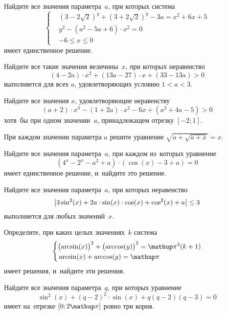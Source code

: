 \begin{problems}
\item
Найдите все значения параметра~$a$, при которых система
\[ \left\{ \begin{aligned} &
    (3 - 2 \sqrt{2})^{y} + (3 + 2 \sqrt{2})^{y} - 3 a
    =
    x^2 + 6 x + 5
\\ &
    y^2 - (a^2 - 5 a + 6) \cdot x^2 = 0
\\ &
    -6 \leq x \leq 0
\end{aligned} \right. \]
имеет единственное решение.


\item
Найдите все такие значения величины~$x$, при которых неравенство
\[
    (4 - 2 a) \cdot x^2 + (13 a - 27) \cdot x + (33 - 13 a) > 0
\]
выполняется для всех $a$, удовлетворяющих условию $1 < a < 3$.

\item
Найдите все значения $x$, удовлетворяющие неравенству
\[
    (a + 2) \cdot x^3 - (1 + 2 a) \cdot x^2 - 6 x + (a^2 + 4 a - 5) > 0
\]
хотя~бы при одном значении~$a$, принадлежащем отрезку $[-2; 1]$.

\item
При каждом значении параметра $a$ решите уравнение\enspace
$\sqrt{a + \sqrt{a + x}} = x$.

\item
Найдите все значения параметра~$a$, при каждом из~которых уравнение
\[
    (4^{x} - 2^{x} - a^2 + a) \cdot
    (\cos(x) - 3 + a)
=
    0
\]
имеет единственное решение, и~найдите это решение.

\item
Найдите все значения параметра~$a$, при которых неравенство
\[
    \bigl \lvert 
        3 \sin^2 (x) +
        2 a \cdot \sin(x) \cdot \cos(x) +
        \cos^2 (x) + a
     \bigr \rvert
\leq
    3
\]
выполняется для любых значений~$x$.

\item
Определите, при каких целых значениях~$k$ система
\[ \left\{ \begin{aligned} &
    \bigl( \arcsin(x) \bigr)^2 + \bigl( \arccos(y) \bigr)^2
    =
    \piconst^3 (k + 1)
\\ &
    \arcsin(x) + \arccos(y) = \piconst
\end{aligned} \right. \]
имеет решения, и~найдите эти решения.

\item
Найдите все значения параметра~$q$, при которых уравнение
\[
    \sin^2 (x) + (q - 2)^2 \cdot \sin(x) + q (q - 2) (q - 3) = 0
\]
имеет на~отрезке $[0;  2 \piconst]$ ровно три корня.

\end{problems}

\endgroup %

